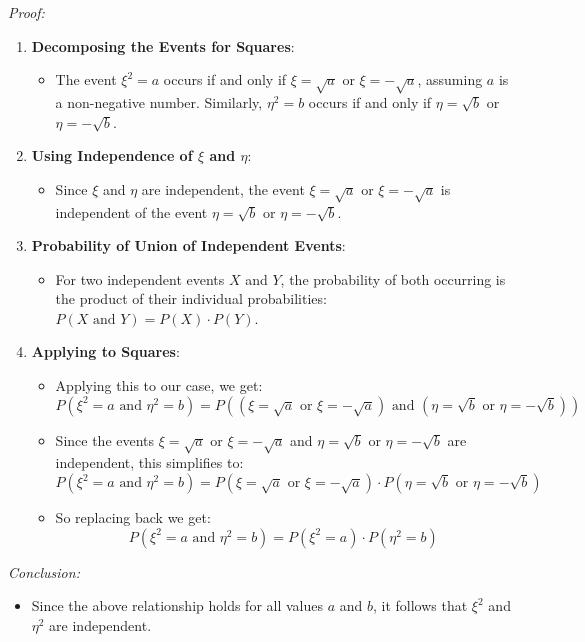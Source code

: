\textit{Proof:}
\begin{enumerate}
    \item \textbf{Decomposing the Events for Squares}:
          \begin{itemize}
              \item The event \(\xi^2 = a\) occurs if and only if \(\xi = \sqrt{a}\) or \(\xi = -\sqrt{a}\), assuming \(a\) is a non-negative number. Similarly, \(\eta^2 = b\) occurs if and only if \(\eta = \sqrt{b}\) or \(\eta = -\sqrt{b}\).
          \end{itemize}
    \item \textbf{Using Independence of \(\xi\) and \(\eta\)}:
          \begin{itemize}
              \item Since \(\xi\) and \(\eta\) are independent, the event \(\xi = \sqrt{a}\) or \(\xi = -\sqrt{a}\) is independent of the event \(\eta = \sqrt{b}\) or \(\eta = -\sqrt{b}\).
          \end{itemize}
    \item \textbf{Probability of Union of Independent Events}:
          \begin{itemize}
              \item For two independent events \(X\) and \(Y\), the probability of both occurring is the product of their individual probabilities: \(P(X \text{ and } Y) = P(X) \cdot P(Y)\).
          \end{itemize}
    \item \textbf{Applying to Squares}:
          \begin{itemize}
              \item Applying this to our case, we get:
                    \[ P(\xi^2 = a \text{ and } \eta^2 = b) = P((\xi = \sqrt{a} \text{ or } \xi = -\sqrt{a}) \text{ and } (\eta = \sqrt{b} \text{ or } \eta = -\sqrt{b})) \]
              \item Since the events \(\xi = \sqrt{a}\) or \(\xi = -\sqrt{a}\) and \(\eta = \sqrt{b}\) or \(\eta = -\sqrt{b}\) are independent, this simplifies to:
                    \[ P(\xi^2 = a \text{ and } \eta^2 = b) = P(\xi = \sqrt{a} \text{ or } \xi = -\sqrt{a}) \cdot P(\eta = \sqrt{b} \text{ or } \eta = -\sqrt{b}) \]
              \item So replacing back we get:
                    \[ P(\xi^2 = a \text{ and } \eta^2 = b) = P(\xi^2 = a) \cdot P(\eta^2 = b) \]
          \end{itemize}
\end{enumerate}

\textit{Conclusion:}
\begin{itemize}
    \item Since the above relationship holds for all values \( a \) and \( b \), it follows that \(\xi^2\) and \(\eta^2\) are independent.
\end{itemize}
